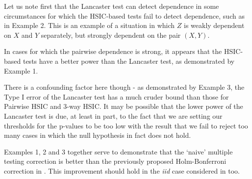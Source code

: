 \documentclass[12pt]{article}
\numberwithin{claim}{section}
\numberwithin{lemma}{section}
\numberwithin{theorem}{section}
\begin{document}

Let us note first that the Lancaster test can detect dependence in some circumstances for which the HSIC-based tests fail to detect dependence, such as in Example 2. This is an example of a situation in which $Z$ is weakly dependent on $X$ and $Y$ separately, but strongly dependent on the pair $(X,Y)$. 

In cases for which the pairwise dependence is strong, it appears that the HSIC-based tests have a better power than the Lancaster test, as demonstrated by Example 1.

There is a confounding factor here though - as demonstrated by Example 3, the Type I error of the Lancaster test has a much cruder bound than those for Pairwise HSIC and 3-way HSIC. It may be possible that the lower power of the Lancaster test is due, at least in part, to the fact that we are setting our thresholds for the p-values to be too low with the result that we fail to reject too many cases in which the null hypothesis in fact does not hold.

Examples 1, 2 and 3 together serve to demonstrate that the `naive' multiple testing correction is better than the previously proposed Holm-Bonferroni correction in \cite{sejdinovic2013kernel}. This improvement should hold in the \emph{iid} case considered in \cite{sejdinovic2013kernel} too.
\end{document}
